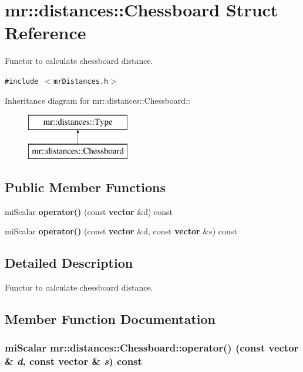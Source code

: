\section{mr::distances::Chessboard Struct Reference}
\label{structmr_1_1distances_1_1Chessboard}
Functor to calculate chessboard distance.  


{\tt \#include $<$mr\-Distances.h$>$}

Inheritance diagram for mr::distances::Chessboard::\begin{figure}[H]
\begin{center}
\leavevmode
\includegraphics[height=2cm]{structmr_1_1distances_1_1Chessboard}
\end{center}
\end{figure}
\subsection*{Public Member Functions}
\begin{CompactItemize}
\item 
mi\-Scalar {\bf operator()} (const {\bf vector} \&d) const 
\item 
mi\-Scalar {\bf operator()} (const {\bf vector} \&d, const {\bf vector} \&s) const 
\end{CompactItemize}


\subsection{Detailed Description}
Functor to calculate chessboard distance. 



\subsection{Member Function Documentation}
\subsubsection{\setlength{\rightskip}{0pt plus 5cm}mi\-Scalar mr::distances::Chessboard::operator() (const {\bf vector} \& {\em d}, const {\bf vector} \& {\em s}) const\hspace{0.3cm}{\tt  [inline, virtual]}}\label{structmr_1_1distances_1_1Chessboard_a1}




